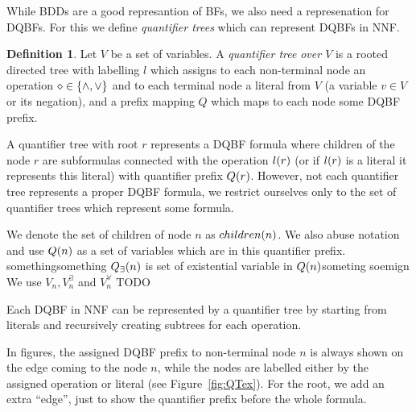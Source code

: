 \documentclass[
  digital, %
  twoside, %
  table,   %
  nolof,     %
  nolot,     %
]{fithesis3}
\let\setbuilder\set
\newcommand{\simpleset}[1]{\{{#1}\}}
\renewcommand{\set}[1]{\normalexpandarg\IfSubStr{#1}{|}{\setbuilder{#1}}{\simpleset{#1}}}
\theoremstyle{definition}
\newtheorem{definition}{Definition}
\theoremstyle{remark}
\newcommand{\vars}[1]{V_{#1}}
\newcommand{\evars}[1]{V_{#1}^{\exists}}
\newcommand{\uvars}[1]{V_{#1}^{\forall}}
\begin{document}
While BDDs are a good represantion of BFs, we also need a represenation for DQBFs. For this we define \emph{quantifier trees} which can represent DQBFs in NNF.

\begin{definition}
  Let $V$ be a set of variables. A \emph{quantifier tree} \emph{over $V$} is a rooted directed tree with labelling $l$ which assigns to each non-terminal node an operation ${\diamond} \in \set{{\land},{\lor}}$ and to each terminal node a literal from $V$ (a variable $v \in V$ or its negation), and a prefix mapping $Q$ which maps to each node some DQBF prefix.
\end{definition}

A quantifier tree with root $r$ represents a DQBF formula where children of the node $r$ are subformulas connected with the operation $l({r})$ (or if $l({r})$ is a literal it represents this literal) with quantifier prefix $Q({r})$. However, not each quantifier tree represents a proper DQBF formula, we restrict ourselves only to the set of quantifier trees which represent some formula.

We denote the set of children of node $n$ as $children({n})$. We also abuse notation and use $Q({n})$ as a set of variables which are in this quantifier prefix. somethingsomething $Q_{\exists}(n)$ is set of existential variable in $Q({n})$someting soemign We use $\vars{n}, \evars{n}$ and $\uvars{n}$  TODO

Each DQBF in NNF can be represented by a quantifier tree by starting from literals and recursively creating subtrees for each operation. 

In figures, the assigned DQBF prefix to non-terminal node $n$ is always shown on the edge coming to the node $n$, while the nodes are labelled either by the assigned operation or literal (see Figure~\ref{fig:QTex}). For the root, we add an extra ``edge'', just to show the quantifier prefix before the whole formula.
\end{document}
